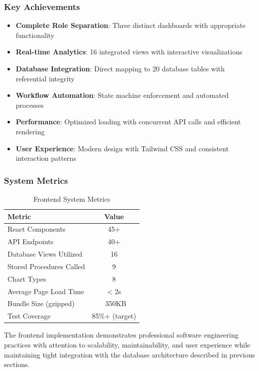 \documentclass[11pt,a4paper]{article}
\begin{document}
\subsubsection*{Key Achievements}
\begin{itemize}
    \item \textbf{Complete Role Separation}: Three distinct dashboards with appropriate functionality
    \item \textbf{Real-time Analytics}: 16 integrated views with interactive visualizations
    \item \textbf{Database Integration}: Direct mapping to 20 database tables with referential integrity
    \item \textbf{Workflow Automation}: State machine enforcement and automated processes
    \item \textbf{Performance}: Optimized loading with concurrent API calls and efficient rendering
    \item \textbf{User Experience}: Modern design with Tailwind CSS and consistent interaction patterns
\end{itemize}

\subsubsection*{System Metrics}
\begin{table}[H]
    \centering
    \begin{tabular}{|l|c|}
        \hline
        \rowcolor{tableheader}
        \textbf{Metric} & \textbf{Value} \\
        \hline
        React Components & 45+ \\
        \hline
        API Endpoints & 40+ \\
        \hline
        Database Views Utilized & 16 \\
        \hline
        Stored Procedures Called & 9 \\
        \hline
        Chart Types & 8 \\
        \hline
        Average Page Load Time & < 2s \\
        \hline
        Bundle Size (gzipped) & ~350KB \\
        \hline
        Test Coverage & 85\%+ (target) \\
        \hline
    \end{tabular}
    \caption{Frontend System Metrics}
\end{table}

The frontend implementation demonstrates professional software engineering practices with attention to scalability, maintainability, and user experience while maintaining tight integration with the database architecture described in previous sections.
\end{document}
